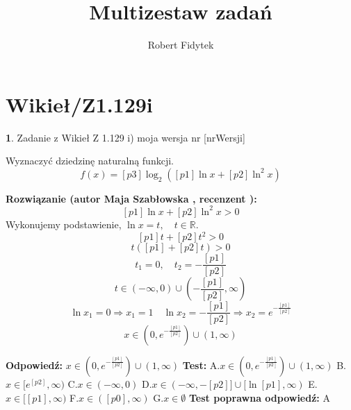 \documentclass[12pt, a4paper]{article}
\title{Multizestaw zadań}
\author{Robert Fidytek}
\date{}
\theoremstyle{definition} %
\newtheorem{zad}{}
\newcommand{\kategoria}[1]{\section{#1}} %
\newcommand{\zadStart}[1]{\begin{zad}#1\newline} %
\newcommand{\zadStop}{\end{zad}}   %
\newcommand{\rozwStart}[2]{\noindent \textbf{Rozwiązanie (autor #1 , recenzent #2): }\newline} %
\newcommand{\rozwStop}{\newline}                                            %
\newcommand{\odpStart}{\noindent \textbf{Odpowiedź:}\newline}    %
\newcommand{\odpStop}{\newline}                                             %
\newcommand{\testStart}{\noindent \textbf{Test:}\newline} %
\newcommand{\testStop}{\newline} %
\newcommand{\kluczStart}{\noindent \textbf{Test poprawna odpowiedź:}\newline} %
\newcommand{\kluczStop}{\newline} %
\begin{document}
\maketitle


\kategoria{Wikieł/Z1.129i}
\zadStart{Zadanie z Wikieł Z 1.129 i) moja wersja nr [nrWersji]}

Wyznaczyć dziedzinę naturalną funkcji.
$$f(x)=[p3]\log_{2}([p1]\ln x + [p2]\ln^{2}x)$$

\zadStop

\rozwStart{Maja Szabłowska}{}
$$[p1]\ln x + [p2]\ln^{2}x>0$$
Wykonujemy podstawienie, $\ln x=t, \quad t\in\mathbb{R}.$
$$[p1]t+[p2]t^{2}>0 $$
$$t([p1]+[p2]t)>0$$
$$t_{1}=0, \quad t_{2}=-\frac{[p1]}{[p2]}$$
$$t\in (-\infty,0)\cup\left(-\frac{[p1]}{[p2]},\infty\right)$$
$$\ln x_{1}=0 \Rightarrow x_{1}=1 \quad \ln x_{2}=-\frac{[p1]}{[p2]} \Rightarrow x_{2}=e^{-\frac{[p1]}{[p2]}}$$
$$x\in \left(0,e^{-\frac{[p1]}{[p2]}}\right)\cup(1,\infty)$$

\rozwStop
\odpStart
$x\in \left(0,e^{-\frac{[p1]}{[p2]}}\right)\cup(1,\infty)$
\odpStop
\testStart
A.$x\in \left(0,e^{-\frac{[p1]}{[p2]}}\right)\cup(1,\infty)$
B.$x\in[e^{[p2]},\infty)$
C.$x\in(-\infty, 0)$
D.$x\in(-\infty, -[p2]] \cup [\ln[p1],\infty)$
E.$x\in[[p1],\infty)$
F.$x\in([p0],\infty)$
G.$x\in\emptyset$
\testStop
\kluczStart
A
\kluczStop
\end{document}

